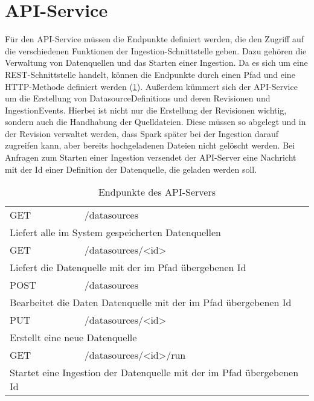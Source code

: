 \section{API-Service}

Für den API-Service müssen die Endpunkte definiert werden, die den Zugriff auf die verschiedenen Funktionen der Ingestion-Schnittstelle geben.
Dazu gehören die Verwaltung von Datenquellen und das Starten einer Ingestion.
Da es sich um eine REST-Schnittstelle handelt, können die Endpunkte durch einen Pfad und eine HTTP-Methode definiert werden (\cref{tab:endpunkte}).
Außerdem kümmert sich der API-Service um die Erstellung von DatasourceDefinitions und deren Revisionen und IngestionEvents.
Hierbei ist nicht nur die Erstellung der Revisionen wichtig, sondern auch die Handhabung der Quelldateien.
Diese müssen so abgelegt und in der Revision verwaltet werden, dass Spark später bei der Ingestion darauf zugreifen kann, aber bereits hochgeladenen Dateien nicht gelöscht werden.
Bei Anfragen zum Starten einer Ingestion versendet der API-Server eine Nachricht mit der Id einer Definition der Datenquelle, die geladen werden soll.

    {\renewcommand{\arraystretch}{1.8}
        \begin{table}[ht]
            \centering
            \begin{tabularx}{\linewidth}{|lX|}
                \hline
                GET  & /datasources                                                                         \\
                \multicolumn{2}{|l|}{Liefert alle im System gespeicherten Datenquellen}                     \\
                \hline
                GET  & /datasources/\textless id\textgreater                                                \\
                \multicolumn{2}{|l|}{Liefert die Datenquelle mit der im Pfad übergebenen Id}                \\
                \hline
                POST & /datasources                                                                         \\
                \multicolumn{2}{|l|}{Bearbeitet die Daten Datenquelle mit der im Pfad übergebenen Id}       \\
                \hline
                PUT  & /datasources/\textless id\textgreater                                                \\
                \multicolumn{2}{|l|}{Erstellt eine neue Datenquelle}                                        \\
                \hline
                GET  & /datasources/\textless id\textgreater/run                                            \\
                \multicolumn{2}{|l|}{Startet eine Ingestion der Datenquelle mit der im Pfad übergebenen Id} \\
                \hline
            \end{tabularx}
            \caption{Endpunkte des API-Servers}
            \label{tab:endpunkte}
        \end{table}
    }
